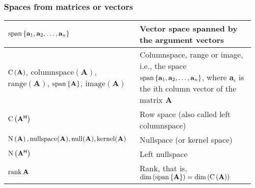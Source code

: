 \subsubsection{Spaces from matrices or vectors}
\begin{xltabular}{\textwidth}{XX}
	\(\operatorname{span}\left\{\mathbf{a}_1, \mathbf{a}_2, \dots, \mathbf{a}_n\right\}\)                                                                                          & Vector space spanned by the argument vectors \cite{golubMatrixComputations2013}                                                                                                                                                                               \\ \hline
	\(\operatorname{C}\left(\mathbf{A}\right)\), \(\mathrm{columnspace}(\mathbf{A})\), \(\mathrm{range}(\mathbf{A})\), \(\operatorname{span}\left\{\mathbf{A}\right\}\), \(\mathrm{image}(\mathbf{A})\) & Columnspace, range or image, i.e., the space \(\operatorname{span}\left\{\mathbf{a}_1,\mathbf{a}_2, \dots, \mathbf{a}_n\right\}\), where \(\mathbf{a}_i\) is the ith column vector of the matrix \(\mathbf{A}\) \cite{strangIntroductionLinearAlgebra1993, nossekAdaptiveArraySignal2015} \\ \hline
	\(\operatorname{C}\left(\mathbf{A}^\mathsf{H}\right)\)                                                                                                                  & Row space (also called left columnspace) \cite{strangIntroductionLinearAlgebra1993, nossekAdaptiveArraySignal2015}                                                                                                                                            \\ \hline
	\(\operatorname{N}\left(\mathbf{A}\right), \mathrm{nullspace}(\mathbf{A}), \mathrm{null}(\mathbf{A}), \mathrm{kernel}(\mathbf{A})\)                                 & Nullspace (or kernel space) \cite{strangIntroductionLinearAlgebra1993, nossekAdaptiveArraySignal2015,theodoridisMachineLearningBayesian2020}                                                                                                                  \\ \hline
	\(\operatorname{N}\left(\mathbf{A^\mathsf{H}}\right)\)                                                                                                              & Left nullspace                                                                                                                                                                                                                                                \\ \hline
	\(\rank{\mathbf{A}}\)                                                                                                                              & Rank, that is, \(\operatorname{dim}\left(\operatorname{span}\left\{\mathbf{A}\right\}\right) = \operatorname{dim}\left(\operatorname{C}\left(\mathbf{A}\right)\right)\) \cite{nossekAdaptiveArraySignal2015}                                                                                                                                                     \\ \hline

\end{xltabular}
